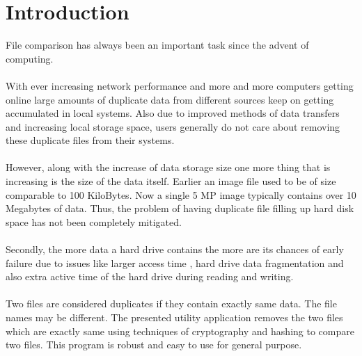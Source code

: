 \cleardoublepage
{}
{}
\chapter{Introduction}


File comparison has always been an important task since the advent of computing.\\~\\
With ever increasing network performance and more and more computers getting online large amounts of duplicate data  from different sources keep on getting accumulated in local systems. Also due to improved methods of data transfers and increasing local storage space, users generally do not care about removing these duplicate files from their systems. 
\\~\\
However, along with the increase of data storage size one more thing that is increasing is the size of the data itself. Earlier an image file used to be of size comparable to 100 KiloBytes. Now a single 5 MP image typically contains over 10 Megabytes of data. Thus, the problem of having duplicate file filling up hard disk space has not been completely mitigated.\\~\\ 
Secondly, the more data a hard drive contains the more are its chances of early failure due to issues like larger access time , hard drive data fragmentation and also extra active time of the hard drive during reading and writing.\\~\\
Two files are considered duplicates if they contain exactly same data. The file names may be different. The presented utility application removes the two files which are exactly same using techniques of cryptography and hashing to compare two files. This program is robust and easy to use for general purpose.\\~\\